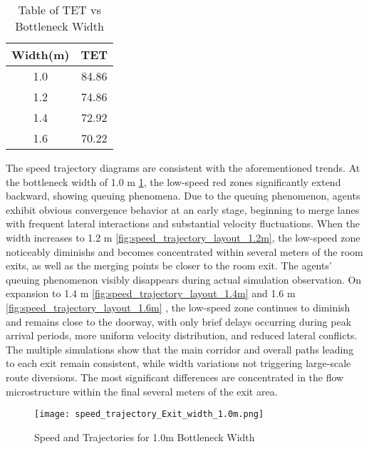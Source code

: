 \begin{table}[ht]
    \caption{Table of TET vs Bottleneck Width} %
    \centering %
    \label{tab:tettable_bottleneck}
    \begin{tabular}{c c} %
        \hline %
        Width(m) & TET \\ [0.5ex] %
        \hline %
        1.0  & 84.86 \\ [1ex]
        1.2  & 74.86 \\ [1ex]
        1.4  & 72.92 \\ [1ex]
        1.6  & 70.22 \\ [1ex]
        \hline
    \end{tabular}
\end{table}

The speed trajectory diagrams are consistent with the aforementioned trends. At the bottleneck width of 1.0 m \ref{fig:speed_trajectory_layout_1.0m}, the low-speed red zones significantly extend backward, showing queuing phenomena. Due to the queuing phenomenon, agents exhibit obvious convergence behavior at an early stage, beginning to merge lanes with frequent lateral interactions and substantial velocity fluctuations. When the width increases to 1.2 m \ref{fig:speed_trajectory_layout_1.2m}, the low-speed zone noticeably diminishs and becomes concentrated within several meters of the room exits, as well as the merging points be closer to the room exit. The agents' queuing phenomenon visibly disappears during actual simulation observation. On expansion to 1.4 m \ref{fig:speed_trajectory_layout_1.4m} and 1.6 m \ref{fig:speed_trajectory_layout_1.6m} , the low-speed zone continues to diminish and remains close to the doorway, with only brief delays occurring during peak arrival periods, more uniform velocity distribution, and reduced lateral conflicts. The multiple simulations show that the main corridor and overall paths leading to each exit remain consistent, while width variations not triggering large-scale route diversions. The most significant differences are concentrated in the flow microstructure within the final several meters of the exit area.

\begin{figure}[h]
    \centering
    \texttt{[image: speed\_trajectory\_Exit\_width\_1.0m.png]}
    \caption{Speed and Trajectories for 1.0m Bottleneck Width}
    \label{fig:speed_trajectory_layout_1.0m}
\end{figure}

